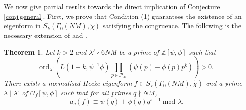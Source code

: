 \documentclass{amsart}
\theoremstyle{plain}
\newtheorem{theorem}{Theorem}[section]
\theoremstyle{definition}
\begin{document}
We now give partial results towards the direct implication of Conjecture \ref{conj:general}. First, we prove that Condition (1) guarantees the existence of an eigenform in $S_k(\Gamma_0(NM),\tilde{\chi})$ satisfying the congruence. The following is the necessary extension of \cite[Theorem 2.10]{dummigan_spencer} and \cite[Theorem 3.0.1]{spencer_2018}.

\begin{theorem}
\label{thm:eigenform}
Let $k > 2$ and $\lambda' \nmid 6NM$ be a prime of $\mathbb{Z}[\psi,\phi]$ such that \[\text{ord}_{\lambda'}\left(L(1-k, \psi^{-1} \phi) \prod_{p \in \mathcal{P}_M}(\psi(p) - \phi(p)p^k)\right)>0.\] There exists a normalised Hecke eigenform $f \in S_k(\Gamma_0(NM), \tilde{\chi})$ and a prime $\lambda\mid \lambda'$ of $\mathcal{O}_f[\psi,\phi]$ such that for all primes $q \nmid NM$, 
\begin{equation*}
    a_q(f) \equiv \psi(q)+\phi(q)q^{k-1} \ \text{mod } \lambda.
\end{equation*}
\end{theorem}
\end{document}

